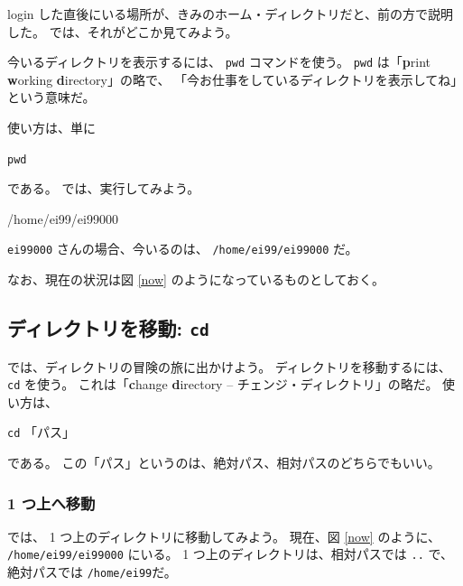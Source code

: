 login した直後にいる場所が、きみのホーム・ディレクトリだと、前の方で説明した。
では、それがどこか見てみよう。

今いるディレクトリを表示するには、 \texttt{pwd} コマンドを使う。
 \texttt{pwd} は「\textbf{p}rint \textbf{w}orking \textbf{d}irectory」の略で、
「今お仕事をしているディレクトリを表示してね」という意味だ。

使い方は、単に

\begin{center}
\begin{minipage}{1.8cm}
\begin{shadebox}
\smallskip
{\Large \texttt{pwd}}
\smallskip
\end{shadebox}
\end{minipage}
\end{center}

\noindent
である。
では、実行してみよう。

\begin{progls}
/home/ei99/ei99000
%
\end{progls}

 \texttt{ei99000} さんの場合、今いるのは、 \texttt{/home/ei99/ei99000} だ。

なお、現在の状況は図 \ref{now} のようになっているものとしておく。

\subsection{ディレクトリを移動: \texttt{cd}}

では、ディレクトリの冒険の旅に出かけよう。
ディレクトリを移動するには、 \texttt{cd} を使う。
これは「\textbf{c}hange \textbf{d}irectory -- チェンジ・ディレクトリ」の略だ。
使い方は、
\begin{center}
\begin{minipage}{4cm}
\begin{shadebox}
\smallskip
{\Large \texttt{cd} 「パス」}
\smallskip
\end{shadebox}
\end{minipage}
\end{center}

\noindent
である。
この「パス」というのは、絶対パス、相対パスのどちらでもいい。

\subsubsection{ 1 つ上へ移動}

では、 1 つ上のディレクトリに移動してみよう。
現在、図 \ref{now} のように、 \texttt{/home/ei99/ei99000} にいる。
 1 つ上のディレクトリは、相対パスでは \texttt{..} で、
絶対パスでは \texttt{/home/ei99}だ。


